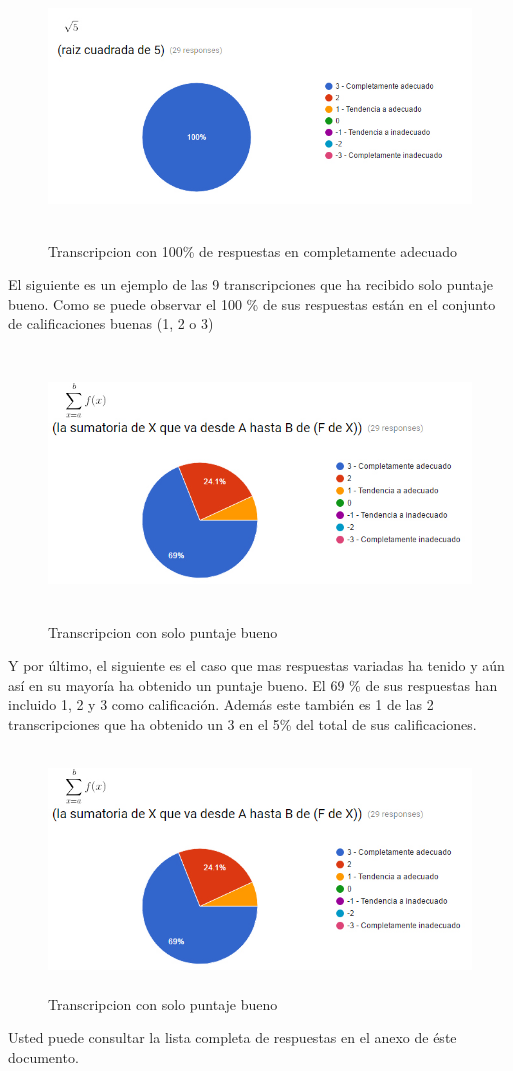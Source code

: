 \begin{figure}[H]
\centering
	\includegraphics[width=15cm, height=6.93cm]{Figures/captura2}
	\caption[]{Transcripcion con 100\% de respuestas en completamente adecuado}
\label{fig:captura2}
\end{figure}

El siguiente es un ejemplo de las 9 transcripciones que ha recibido solo puntaje bueno. Como se puede observar el 100 \% de sus respuestas están en el conjunto de calificaciones buenas (1, 2 o 3)

\begin{figure}[H]
\centering
	\includegraphics[width=15cm, height=7.15cm]{Figures/captura1}
	\caption[]{Transcripcion con solo puntaje bueno}
\label{fig:captura1}
\end{figure}

Y por último, el siguiente es el caso que mas respuestas variadas ha tenido y aún así en su mayoría ha obtenido un puntaje bueno. El 69 \% de sus respuestas han incluido 1, 2 y 3 como calificación. Además este también es 1 de las 2 transcripciones que ha obtenido un 3 en el 5\% del total de sus calificaciones.

\begin{figure}[H]
\centering
	\includegraphics[width=15cm, height=6.39cm]{Figures/captura1}
	\caption[]{Transcripcion con solo puntaje bueno}
\label{fig:captura1}
\end{figure}

Usted puede consultar la lista completa de respuestas en el anexo de éste documento.